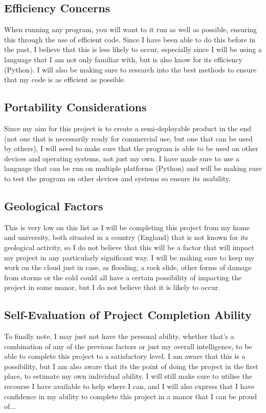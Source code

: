 \documentclass{article}
\begin{document}
\subsection{Efficiency Concerns}
When running any program, you will want to it run as well as possible, ensuring this through the use of efficient code. Since I have been able to do this before in the past, I believe that this is less likely to occur, especially since I will be using a language that I am not only familiar with, but is also know for its efficiency (Python). I will also be making sure to research into the best methods to ensure that my code is as efficient as possible.

\subsection{Portability Considerations}
Since my aim for this project is to create a semi-deployable product in the end (not one that is necessarily ready for commercial use, but one that can be used by others), I will need to make sure that the program is able to be used on other devices and operating systems, not just my own. I have made sure to use a language that can be run on multiple platforms (Python) and will be making sure to test the program on other devices and systems so ensure its usability.

\subsection{Geological Factors}
This is very low on this list as I will be completing this project from my home and university, both situated in a country (England) that is not known for its geological activity, so I do not believe that this will be a factor that will impact my project in any particularly significant way. I will be making sure to keep my work on the cloud just in case, as flooding, a rock slide, other forms of damage from storms or the cold could all have a certain possibility of impacting the project in some manor, but I do not believe that it is likely to occur.

\subsection{Self-Evaluation of Project Completion Ability}
To finally note, I may just not have the personal ability, whether that's a combination of any of the previous factors or just my overall intelligence, to be able to complete this project to a satisfactory level. I am aware that this is a possibility, but I am also aware that its the point of doing the project in the first place, to estimate my own individual ability. I will still make sure to utilise the recourse I have available to help where I can, and I will also express that I have confidence in my ability to complete this project in a manor that I can be proud of...
\end{document}

